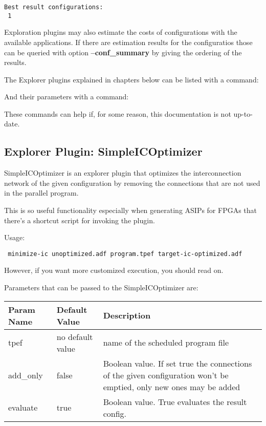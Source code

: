 \documentclass[twoside]{tceusermanual}
\begin{document}

\begin{verbatim}
Best result configurations:
 1
\end{verbatim}
Exploration plugins may also estimate the costs of configurations with the
available applications. If there are estimation results for the configuratios
those can be queried with option \textbf{--conf\_summary} by giving the
ordering of the results.

The Explorer plugins explained in chapters below can be listed with a command:


And their parameters with a command:


These commands can help if, for some reason, this documentation is not up-to-date.

\subsection{Explorer Plugin: SimpleICOptimizer}

SimpleICOptimizer is an explorer plugin that optimizes the interconnection
network of the given configuration by removing the connections that are not
used in the parallel program. 

This is so useful functionality especially when generating ASIPs for
FPGAs that there's a shortcut script for invoking the plugin.

Usage: 
\begin{verbatim}
 minimize-ic unoptimized.adf program.tpef target-ic-optimized.adf
\end{verbatim}

However, if you want more customized execution, you should read on.

Parameters that can be passed to the
SimpleICOptimizer are:

\begin{tabular}{p{}p{}
                p{}}
\textbf{Param Name} &\textbf{Default Value} &\textbf{Description} \\
\hline
tpef & no default value &  name of the scheduled program file \\
add\_only & false &  Boolean value. If set true the connections of the given 
configuration won't be emptied, only new ones may be added\\
evaluate & true &  Boolean value. True evaluates the result config. \\
\end{tabular}\\
\end{document}
